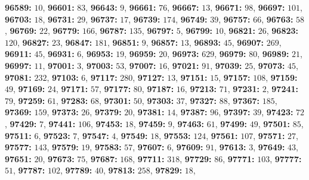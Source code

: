 \textsf{\bfseries 96589:} $10$, \textsf{\bfseries 96601:} $83$, \textsf{\bfseries 96643:} $9$, \textsf{\bfseries 96661:} $76$, \textsf{\bfseries 96667:} $13$, \textsf{\bfseries 96671:} $98$, \textsf{\bfseries 96697:} $101$, \textsf{\bfseries 96703:} $18$, \textsf{\bfseries 96731:} $29$, \textsf{\bfseries 96737:} $17$, \textsf{\bfseries 96739:} $174$, \textsf{\bfseries 96749:} $39$, \textsf{\bfseries 96757:} $66$, \textsf{\bfseries 96763:} $58$, \textsf{\bfseries 96769:} $22$, \textsf{\bfseries 96779:} $166$, \textsf{\bfseries 96787:} $135$, \textsf{\bfseries 96797:} $5$, \textsf{\bfseries 96799:} $10$, \textsf{\bfseries 96821:} $26$, \textsf{\bfseries 96823:} $120$, \textsf{\bfseries 96827:} $23$, \textsf{\bfseries 96847:} $181$, \textsf{\bfseries 96851:} $9$, \textsf{\bfseries 96857:} $13$, \textsf{\bfseries 96893:} $45$, \textsf{\bfseries 96907:} $269$, \textsf{\bfseries 96911:} $45$, \textsf{\bfseries 96931:} $6$, \textsf{\bfseries 96953:} $19$, \textsf{\bfseries 96959:} $20$, \textsf{\bfseries 96973:} $629$, \textsf{\bfseries 96979:} $80$, \textsf{\bfseries 96989:} $21$, \textsf{\bfseries 96997:} $11$, \textsf{\bfseries 97001:} $3$, \textsf{\bfseries 97003:} $53$, \textsf{\bfseries 97007:} $16$, \textsf{\bfseries 97021:} $91$, \textsf{\bfseries 97039:} $25$, \textsf{\bfseries 97073:} $45$, \textsf{\bfseries 97081:} $232$, \textsf{\bfseries 97103:} $6$, \textsf{\bfseries 97117:} $280$, \textsf{\bfseries 97127:} $13$, \textsf{\bfseries 97151:} $15$, \textsf{\bfseries 97157:} $108$, \textsf{\bfseries 97159:} $49$, \textsf{\bfseries 97169:} $24$, \textsf{\bfseries 97171:} $57$, \textsf{\bfseries 97177:} $80$, \textsf{\bfseries 97187:} $16$, \textsf{\bfseries 97213:} $71$, \textsf{\bfseries 97231:} $2$, \textsf{\bfseries 97241:} $79$, \textsf{\bfseries 97259:} $61$, \textsf{\bfseries 97283:} $68$, \textsf{\bfseries 97301:} $50$, \textsf{\bfseries 97303:} $37$, \textsf{\bfseries 97327:} $88$, \textsf{\bfseries 97367:} $185$, \textsf{\bfseries 97369:} $159$, \textsf{\bfseries 97373:} $26$, \textsf{\bfseries 97379:} $20$, \textsf{\bfseries 97381:} $14$, \textsf{\bfseries 97387:} $96$, \textsf{\bfseries 97397:} $39$, \textsf{\bfseries 97423:} $72$, \textsf{\bfseries 97429:} $7$, \textsf{\bfseries 97441:} $106$, \textsf{\bfseries 97453:} $18$, \textsf{\bfseries 97459:} $9$, \textsf{\bfseries 97463:} $61$, \textsf{\bfseries 97499:} $49$, \textsf{\bfseries 97501:} $85$, \textsf{\bfseries 97511:} $6$, \textsf{\bfseries 97523:} $7$, \textsf{\bfseries 97547:} $4$, \textsf{\bfseries 97549:} $18$, \textsf{\bfseries 97553:} $124$, \textsf{\bfseries 97561:} $107$, \textsf{\bfseries 97571:} $27$, \textsf{\bfseries 97577:} $143$, \textsf{\bfseries 97579:} $19$, \textsf{\bfseries 97583:} $57$, \textsf{\bfseries 97607:} $6$, \textsf{\bfseries 97609:} $91$, \textsf{\bfseries 97613:} $3$, \textsf{\bfseries 97649:} $43$, \textsf{\bfseries 97651:} $20$, \textsf{\bfseries 97673:} $75$, \textsf{\bfseries 97687:} $168$, \textsf{\bfseries 97711:} $318$, \textsf{\bfseries 97729:} $86$, \textsf{\bfseries 97771:} $103$, \textsf{\bfseries 97777:} $51$, \textsf{\bfseries 97787:} $102$, \textsf{\bfseries 97789:} $40$, \textsf{\bfseries 97813:} $258$, \textsf{\bfseries 97829:} $18$, 
